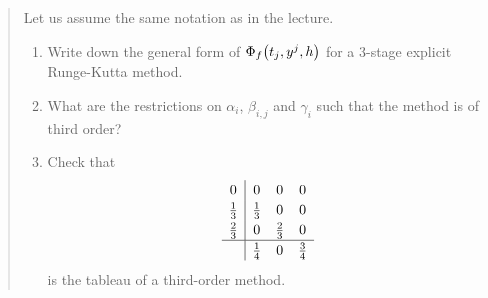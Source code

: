 \documentclass{exercise}
\begin{document}
	\begin{quote}
		Let us assume the same notation as in the lecture.
		\begin{enumerate}
			\item Write down the general form of \(\Phi_f\parentheses*{t_j, y^j, h}\) for a 3-stage explicit Runge-Kutta method.
			\item What are the restrictions on \(\alpha_i\), \(\beta_{i, j}\) and \(\gamma_i\) such that the method is of third order?
			\item Check that
			\[
				\renewcommand\arraystretch{1.2}
				\begin{array}{c|ccc}
					0 & 0 & 0 & 0\\
					\frac{1}{3} & \frac{1}{3} & 0 & 0\\
					\frac{2}{3} & 0 & \frac{2}{3} & 0\\
					\hline
					& \frac{1}{4} & 0 & \frac{3}{4}
				\end{array}
			\]
			is the tableau of a third-order method.
		\end{enumerate}
	\end{quote}
\end{document}
